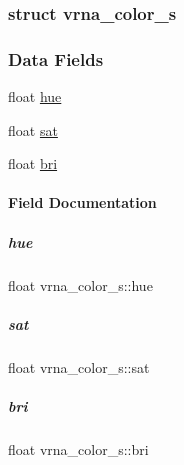 \label{structvrna__color__s}
\subsubsection{struct vrna\+\_\+color\+\_\+s}
\subsubsection*{Data Fields}
\begin{DoxyCompactItemize}
\item 
float \mbox{\hyperlink{group__data__structures_aab217f6758ec24b8e0c4d090e2c2b4e1}{hue}}
\item 
float \mbox{\hyperlink{group__data__structures_aead60f76303402112139abf5adfb4399}{sat}}
\item 
float \mbox{\hyperlink{group__data__structures_a6ba545d33579e0b05d68121b5d66dceb}{bri}}
\end{DoxyCompactItemize}


\paragraph{Field Documentation}
\mbox{\label{group__data__structures_aab217f6758ec24b8e0c4d090e2c2b4e1}} 
\subparagraph{\texorpdfstring{hue}{hue}}
{\footnotesize\ttfamily float vrna\+\_\+color\+\_\+s\+::hue}

\mbox{\label{group__data__structures_aead60f76303402112139abf5adfb4399}} 
\subparagraph{\texorpdfstring{sat}{sat}}
{\footnotesize\ttfamily float vrna\+\_\+color\+\_\+s\+::sat}

\mbox{\label{group__data__structures_a6ba545d33579e0b05d68121b5d66dceb}} 
\subparagraph{\texorpdfstring{bri}{bri}}
{\footnotesize\ttfamily float vrna\+\_\+color\+\_\+s\+::bri}

\label{structvrna__data__linear__s}
